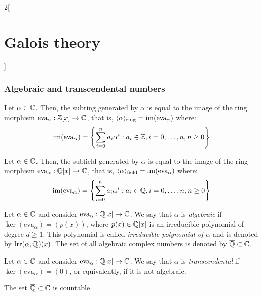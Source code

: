 \documentclass[../../../main.tex]{subfiles}
\begin{document}
\begin{multicols}{2}[\section{Galois theory}]
  \subsubsection*{Algebraic and transcendental numbers}
  \begin{prop}
    Let $\alpha\in\mathbb{C}$. Then, the subring generated by $\alpha$ is equal to the image of the ring morphism $\text{eva}_\alpha:\mathbb{Z}[x]\rightarrow\mathbb{C}$, that is, $\langle\alpha\rangle_\text{ring}=\operatorname{im}(\text{eva}_\alpha)$ where: $$\operatorname{im}(\text{eva}_\alpha)=\left\{\sum_{i=0}^na_i\alpha^i:a_i\in\mathbb{Z},i=0,\ldots, n,n\geq 0\right\}$$
  \end{prop}
  \begin{prop}
    Let $\alpha\in\mathbb{C}$. Then, the subfield generated by $\alpha$ is equal to the image of the ring morphism $\text{eva}_\alpha:\mathbb{Q}[x]\rightarrow\mathbb{C}$, that is, $\langle\alpha\rangle_\text{field}=\operatorname{im}(\text{eva}_\alpha)$ where: $$\operatorname{im}(\text{eva}_\alpha)=\left\{\sum_{i=0}^na_i\alpha^i:a_i\in\mathbb{Q},i=0,\ldots, n,n\geq 0\right\}$$
  \end{prop}
  \begin{definition}
    Let $\alpha\in\mathbb{C}$ and consider $\text{eva}_\alpha:\mathbb{Q}[x]\rightarrow\mathbb{C}$. We say that $\alpha$ is \textit{algebraic} if $\ker(\text{eva}_\alpha)=(p(x))$, where $p(x)\in\mathbb{Q}[x]$ is an irreducible polynomial of degree $d\geq 1$. This polynomial is called \textit{irreducible polynomial of $\alpha$} and is denoted by $\operatorname{Irr}(\alpha,\mathbb{Q})(x)$. The set of all algebraic complex numbers is denoted by $\overline{\mathbb{Q}}\subset\mathbb{C}$.
  \end{definition}
  \begin{definition}
    Let $\alpha\in\mathbb{C}$ and consider $\text{eva}_\alpha:\mathbb{Q}[x]\rightarrow\mathbb{C}$. We say that $\alpha$ is \textit{transcendental} if $\ker(\text{eva}_\alpha)=(0)$, or equivalently, if it is not algebraic.
  \end{definition}
  \begin{theorem}
    The set $\overline{\mathbb{Q}}\subset\mathbb{C}$ is countable.
  \end{theorem}

\end{multicols}
\end{document}
